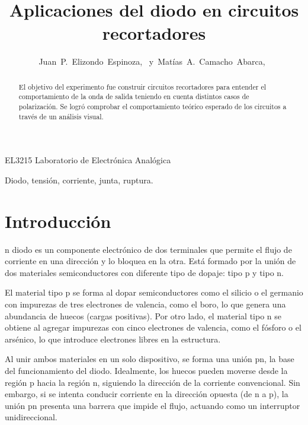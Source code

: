 \documentclass[journal]{IEEEtran}
\begin{document}
\title{Aplicaciones del diodo en circuitos recortadores}


\author{Juan~P.~Elizondo~Espinoza,~
        y~Matías~A.~Camacho~Abarca,~
}


%
{EL3215 Laboratorio de Electrónica Analógica}


\maketitle


\begin{abstract}
El objetivo del experimento fue construir circuitos recortadores para entender el comportamiento de la onda de salida
teniendo en cuenta distintos casos de polarización. Se logró comprobar el comportamiento teórico esperado de los circuitos a través de un análisis visual.
\end{abstract}

\begin{IEEEkeywords}
Diodo, tensión, corriente, junta, ruptura.
\end{IEEEkeywords}


\section{Introducción}

n diodo es un componente electrónico de dos terminales que permite el flujo de corriente en una dirección y lo bloquea en la otra. Está formado por la unión de dos materiales semiconductores con diferente tipo de dopaje: tipo p y tipo n.

El material tipo p se forma al dopar semiconductores como el silicio o el germanio con impurezas de tres electrones de valencia, como el boro, lo que genera una abundancia de huecos (cargas positivas). Por otro lado, el material tipo n se obtiene al agregar impurezas con cinco electrones de valencia, como el fósforo o el arsénico, lo que introduce electrones libres en la estructura.

Al unir ambos materiales en un solo dispositivo, se forma una unión pn, la base del funcionamiento del diodo. Idealmente, los huecos pueden moverse desde la región p hacia la región n, siguiendo la dirección de la corriente convencional. Sin embargo, si se intenta conducir corriente en la dirección opuesta (de n a p), la unión pn presenta una barrera que impide el flujo, actuando como un interruptor unidireccional.
\end{document}
